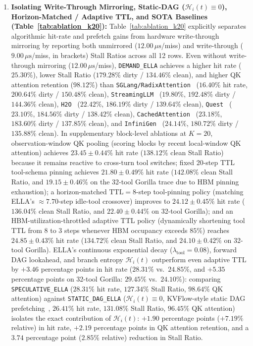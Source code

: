 \documentclass[conference,10pt]{IEEEtran}
\begin{document}
\begin{enumerate}
    \item \textbf{Isolating Write-Through Mirroring, Static-DAG ($\mathcal{H}_i(t)\equiv 0$), Horizon-Matched / Adaptive TTL, and SOTA Baselines (Table~\ref{tab:ablation_k20}):} Table~\ref{tab:ablation_k20} explicitly separates algorithmic hit-rate and prefetch gains from hardware write-through mirroring by reporting both unmirrored ($12.00\,\mu\text{s}$/miss) and write-through ($9.00\,\mu\text{s}$/miss, in brackets) Stall Ratios across all 12 rows. Even without write-through mirroring ($12.00\,\mu\text{s}$/miss), \texttt{DEMAND\_ELLA} achieves a higher hit rate ($25.30\%$), lower Stall Ratio ($179.28\%$ dirty / $134.46\%$ clean), and higher QK attention retention ($98.12\%$) than \texttt{SGLang/RadixAttention}~\cite{zheng2024sglang} ($16.40\%$ hit rate, $200.64\%$ dirty / $150.48\%$ clean), \texttt{StreamingLLM}~\cite{xiao2023efficient} ($19.80\%$, $192.48\%$ dirty / $144.36\%$ clean), \texttt{H2O}~\cite{zhang2023h2o} ($22.42\%$, $186.19\%$ dirty / $139.64\%$ clean), \texttt{Quest}~\cite{tang2024quest} ($23.10\%$, $184.56\%$ dirty / $138.42\%$ clean), \texttt{CachedAttention}~\cite{gao2024cachedattention} ($23.18\%$, $183.60\%$ dirty / $137.85\%$ clean), and \texttt{InfiniGen}~\cite{lee2024infinigen} ($24.14\%$, $180.72\%$ dirty / $135.88\%$ clean). In supplementary block-level ablations at $K=20$, observation-window QK pooling (scoring blocks by recent local-window QK attention) achieves $23.45 \pm 0.44\%$ hit rate ($138.12\%$ clean Stall Ratio) because it remains reactive to cross-turn tool switches; fixed 20-step TTL tool-schema pinning achieves $21.80 \pm 0.49\%$ hit rate ($142.08\%$ clean Stall Ratio, and $19.15 \pm 0.46\%$ on the 32-tool Gorilla trace due to HBM pinning exhaustion); a horizon-matched $\text{TTL} = 8$-step tool-pinning policy (matching ELLA's $\approx 7.70$-step idle-tool crossover) improves to $24.12 \pm 0.45\%$ hit rate ($136.04\%$ clean Stall Ratio, and $22.40 \pm 0.44\%$ on 32-tool Gorilla); and an HBM-utilization-throttled adaptive TTL policy (dynamically shortening tool TTL from $8$ to $3$ steps whenever HBM occupancy exceeds $85\%$) reaches $24.85 \pm 0.43\%$ hit rate ($134.72\%$ clean Stall Ratio, and $24.10 \pm 0.42\%$ on 32-tool Gorilla). ELLA's continuous exponential decay ($\lambda_{\text{tool}}=0.08$), forward DAG lookahead, and branch entropy $\mathcal{H}_i(t)$ outperform even adaptive TTL by $+3.46$ percentage points in hit rate ($28.31\%$ vs.\ $24.85\%$, and $+5.35$ percentage points on 32-tool Gorilla: $29.45\%$ vs.\ $24.10\%$): comparing \texttt{SPECULATIVE\_ELLA} ($28.31\%$ hit rate, $127.34\%$ Stall Ratio, $98.64\%$ QK attention) against \texttt{STATIC\_DAG\_ELLA} ($\mathcal{H}_i(t)\equiv 0$, KVFlow-style static DAG prefetching~\cite{pan2025kvflow}, $26.41\%$ hit rate, $131.08\%$ Stall Ratio, $96.45\%$ QK attention) isolates the exact contribution of $\mathcal{H}_i(t)$: $+1.90$ percentage points ($+7.19\%$ relative) in hit rate, $+2.19$ percentage points in QK attention retention, and a $3.74$ percentage point ($2.85\%$ relative) reduction in Stall Ratio.
\end{enumerate}
\end{document}
